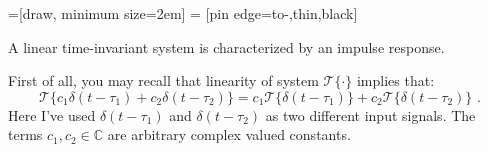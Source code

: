 =[draw, minimum size=2em]
 = [pin edge={to-,thin,black}]

\begin{marginfigure}
\begin{center}


\end{center}
\caption{A linear time-invariant system is characterized by an impulse response.}
\end{marginfigure}

First of all, you may recall that linearity of system $\mathcal{T}\{\cdot\}$ implies that:
\begin{equation}
\mathcal{T}\{c_1 \delta(t-\tau_1) + c_2 \delta(t-\tau_2)\} = c_1 \mathcal{T}\{\delta(t-\tau_1)\}+ c_2 \mathcal{T}\{\delta(t-\tau_2)\}\,\,.
\end{equation}
Here I've used $\delta(t-\tau_1)$ and $\delta(t-\tau_2)$ as two different input signals. The terms $c_1,c_2\in \mathbb{C}$ are arbitrary complex valued constants.

